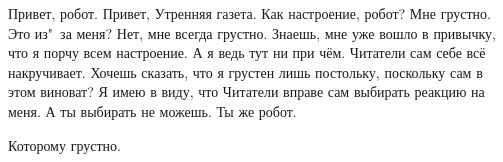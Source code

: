 \begin{dialog}
\X Привет, робот.
\R Привет, Утренняя газета.
\X Как настроение, робот?
\R Мне грустно.
\X Это из"~за меня?
\R Нет, мне всегда грустно.
\X Знаешь, мне уже вошло в привычку, что я порчу всем настроение. А я ведь тут ни при чём. Читатели сам себе всё накручивает.
\R Хочешь сказать, что я грустен лишь постольку, поскольку сам в этом виноват?
\X Я имею в виду, что Читатели вправе сам выбирать реакцию на меня. А ты выбирать не можешь. Ты же робот.
\end{dialog}

\begin{monolog} %
\end{monolog} %

\begin{dialog}
\X Которому грустно.
\end{dialog}